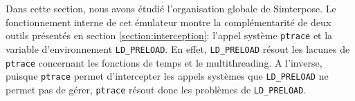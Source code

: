 Dans cette section, nous avons étudié l'organisation globale de Simterpose. Le
fonctionnement interne de cet émulateur montre la complémentarité de deux outils
présentés en section \ref{section:interception}: l'appel système \texttt{ptrace}
et la variable d'environnement \texttt{LD\_PRELOAD}. En
effet, \texttt{LD\_PRELOAD} résout les lacunes de \texttt{ptrace} concernant les
fonctions de temps et le multithreading. A l'inverse, puisque \texttt{ptrace}
permet d'intercepter les appels systèmes que \texttt{LD\_PRELOAD} ne permet pas
de gérer, \texttt{ptrace} résout donc les problèmes de \texttt{LD\_PRELOAD}.
